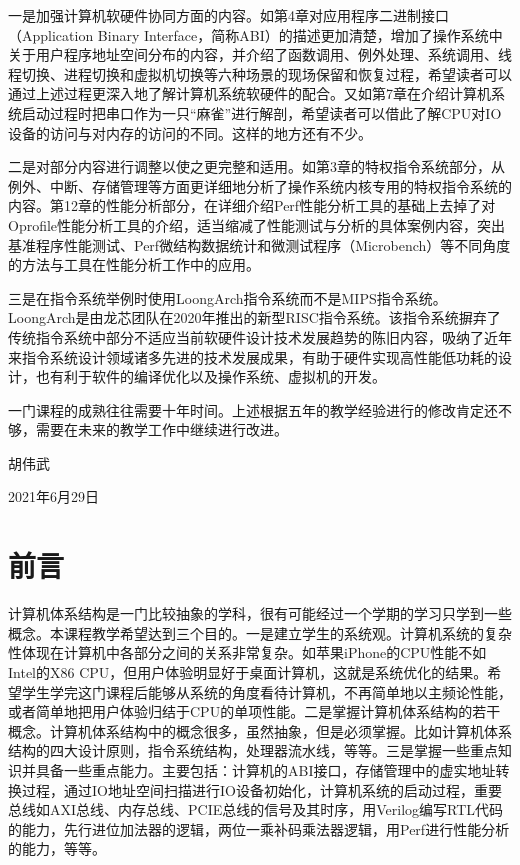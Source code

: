 \documentclass[]{ctexbook}
\begin{document}
一是加强计算机软硬件协同方面的内容。如第4章对应用程序二进制接口（Application Binary Interface，简称ABI）的描述更加清楚，增加了操作系统中关于用户程序地址空间分布的内容，并介绍了函数调用、例外处理、系统调用、线程切换、进程切换和虚拟机切换等六种场景的现场保留和恢复过程，希望读者可以通过上述过程更深入地了解计算机系统软硬件的配合。又如第7章在介绍计算机系统启动过程时把串口作为一只``麻雀''进行解剖，希望读者可以借此了解CPU对IO设备的访问与对内存的访问的不同。这样的地方还有不少。

二是对部分内容进行调整以使之更完整和适用。如第3章的特权指令系统部分，从例外、中断、存储管理等方面更详细地分析了操作系统内核专用的特权指令系统的内容。第12章的性能分析部分，在详细介绍Perf性能分析工具的基础上去掉了对Oprofile性能分析工具的介绍，适当缩减了性能测试与分析的具体案例内容，突出基准程序性能测试、Perf微结构数据统计和微测试程序（Microbench）等不同角度的方法与工具在性能分析工作中的应用。

三是在指令系统举例时使用LoongArch指令系统而不是MIPS指令系统。LoongArch是由龙芯团队在2020年推出的新型RISC指令系统。该指令系统摒弃了传统指令系统中部分不适应当前软硬件设计技术发展趋势的陈旧内容，吸纳了近年来指令系统设计领域诸多先进的技术发展成果，有助于硬件实现高性能低功耗的设计，也有利于软件的编译优化以及操作系统、虚拟机的开发。

一门课程的成熟往往需要十年时间。上述根据五年的教学经验进行的修改肯定还不够，需要在未来的教学工作中继续进行改进。

胡伟武

2021年6月29日

\newpage

\hypertarget{ux524dux8a00}{%
\chapter*{前言}\label{ux524dux8a00}}



计算机体系结构是一门比较抽象的学科，很有可能经过一个学期的学习只学到一些概念。本课程教学希望达到三个目的。一是建立学生的系统观。计算机系统的复杂性体现在计算机中各部分之间的关系非常复杂。如苹果iPhone的CPU性能不如Intel的X86 CPU，但用户体验明显好于桌面计算机，这就是系统优化的结果。希望学生学完这门课程后能够从系统的角度看待计算机，不再简单地以主频论性能，或者简单地把用户体验归结于CPU的单项性能。二是掌握计算机体系结构的若干概念。计算机体系结构中的概念很多，虽然抽象，但是必须掌握。比如计算机体系结构的四大设计原则，指令系统结构，处理器流水线，等等。三是掌握一些重点知识并具备一些重点能力。主要包括：计算机的ABI接口，存储管理中的虚实地址转换过程，通过IO地址空间扫描进行IO设备初始化，计算机系统的启动过程，重要总线如AXI总线、内存总线、PCIE总线的信号及其时序，用Verilog编写RTL代码的能力，先行进位加法器的逻辑，两位一乘补码乘法器逻辑，用Perf进行性能分析的能力，等等。
\end{document}
